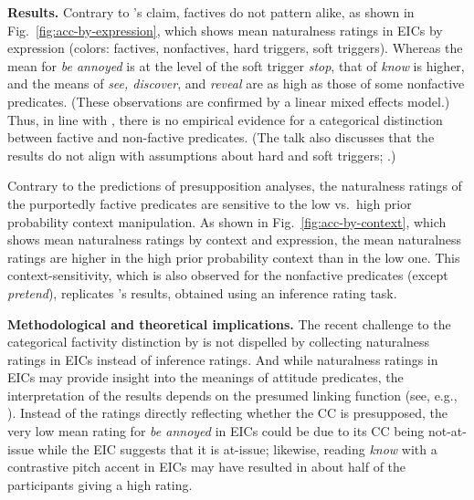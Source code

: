 \documentclass[12pt,fleqn]{article}
\newcommand{\6}{\mbox{$[\hspace*{-.6mm}[$}}
\newcommand{\9}{\mbox{$]\hspace*{-.6mm}]$}}
\newcommand{\citepos}[1]{\citeauthor{#1}'s \citeyear{#1}}
\begin{document}


\noindent
{\bf Results.} Contrary to \citepos{mandelkern-etal2020} claim, factives do not pattern alike, as shown in Fig.~\ref{fig:acc-by-expression}, which shows mean naturalness ratings in EICs by expression (colors: \color{orange}factives\color{black}, \color{gray}nonfactives\color{black}, hard triggers, \color{green}soft triggers\color{black}). Whereas the mean for {\em be annoyed} is at the level of the soft trigger {\em stop}, that of {\em know} is higher, and the means of {\em see, discover}, and {\em reveal} are as high as those of some nonfactive predicates. (These observations are confirmed by a linear mixed effects model.) Thus, in line with \citealt{degen-tonhauser-language}, there is no empirical evidence for a categorical distinction between factive and non-factive predicates. (The talk also discusses that the results do not align with assumptions about hard and soft triggers; \citealt{simons01,abusch10}.)

Contrary to the predictions of presupposition analyses, the naturalness ratings of the purportedly factive predicates are sensitive to the low vs.\ high prior probability context manipulation. As shown in Fig.~\ref{fig:acc-by-context}, which shows mean naturalness ratings by context and expression, the mean naturalness ratings are higher in the high prior probability context than in the low one. This context-sensitivity, which is also observed for the nonfactive predicates (except {\em pretend}), replicates \citepos{degen-tonhauser-openmind} results, obtained using an inference rating task.

\noindent
{\bf Methodological and theoretical implications.} The recent challenge to the categorical factivity distinction by \citealt{degen-tonhauser-language} is not dispelled by collecting naturalness ratings in EICs instead of inference ratings. And while naturalness ratings in EICs may provide insight into the meanings of attitude predicates, the interpretation of the results depends on the presumed linking function (see, e.g., \citealt{sprouse2018}). Instead of the ratings directly reflecting whether the CC is presupposed, the very low mean rating for {\em be annoyed} in EICs could be due to its CC being not-at-issue while the EIC suggests that it is at-issue; likewise, reading {\em know} with a contrastive pitch accent in EICs may have resulted in about half of the participants giving a high rating.
\end{document}
